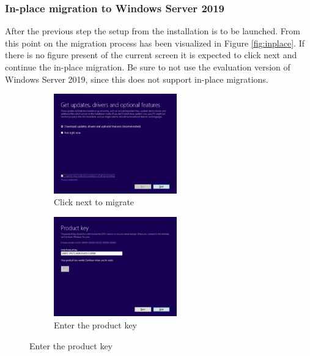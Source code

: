 \subsubsection{In-place migration to Windows Server 2019}
After the previous step the setup from the installation is to be launched. From this point on the migration process has been visualized in Figure \ref{fig:inplace}. If there is no figure present of the current screen it is expected to click next and continue the in-place migration. Be sure to not use the evaluation version of Windows Server 2019, since this does not support in-place migrations.
\begin{figure}[h]
	\begin{subfigure}{0.5\textwidth}
		\includegraphics[width=0.9\linewidth,height=4.3cm]{img/Methodologie/InPlace0.png}
		\captionsetup{width=0.8\linewidth}
		\centering		
		\caption{Click next to migrate}
		\label{fig:inplace2}
	\end{subfigure}
	\begin{subfigure}{0.5\textwidth}
		\captionsetup{width=0.8\linewidth}
		\includegraphics[width=0.9\linewidth,height=4.3cm]{img/Methodologie/InPlace1.png}
		\centering
		\caption{Enter the product key}
		\label{fig:inplace3}
	\end{subfigure}
\end{figure}
